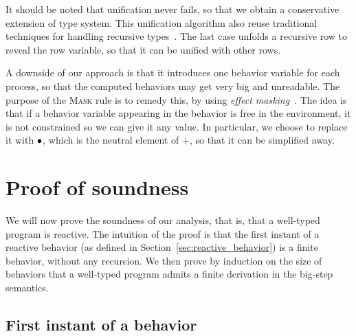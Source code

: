 \documentclass[9pt]{sigplanconf}
\begin{document}
%
It should be noted that unification never fails, so that we obtain a conservative extension of \rml type system. This unification algorithm also reuse traditional techniques for handling recursive types~\cite{Huet:1975}. The last case unfolds a recursive row to reveal the row variable, so that it can be unified with other rows. 

A downside of our approach is that it introduces one behavior variable for each process, so that the computed behaviors may get very big and unreadable. The purpose of the \textsc{Mask} rule is to remedy this, by using \emph{effect masking}~\cite{Lucassen:1988}. The idea is that if a behavior variable appearing in the behavior is free in the environment, it is not constrained so we can give it any value. In particular, we choose to replace it with $\bullet$, which is the neutral element of $+$, so that it can be simplified away.


\section{Proof of soundness}
\label{sec:soundness}



We will now prove the soundness of our analysis, that is, that a well-typed program is reactive. The intuition of the proof is that the first instant of a reactive behavior (as defined in Section~\ref{sec:reactive_behavior}) is a finite behavior, without any recursion. We then prove by induction on the size of behaviors that a well-typed program admits a finite derivation in the big-step semantics.

\subsection{First instant of a behavior}
\end{document}
